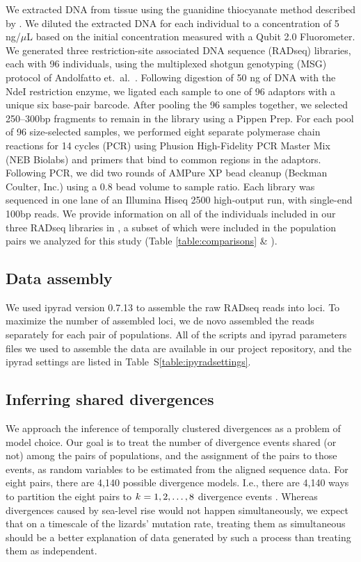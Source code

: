 We extracted DNA from tissue using the guanidine thiocyanate method described
by \citet{Esselstyn2008}.
We diluted the extracted DNA for each individual to a concentration of 5
ng/$\mu$L based on the initial concentration measured with a Qubit 2.0
Fluorometer.
We generated three restriction-site associated DNA sequence (RADseq) libraries,
each with 96 individuals, using the multiplexed shotgun genotyping (MSG)
protocol of Andolfatto et.\ al.\ \citep{Andolfatto2011}.
Following digestion of 50 ng of DNA with the NdeI restriction enzyme, we
ligated each sample to one of 96 adaptors with a unique six base-pair barcode.
After pooling the 96 samples together, we selected 250--300bp fragments to
remain in the library using a Pippen Prep.
For each pool of 96 size-selected samples, we performed eight separate
polymerase chain reactions for 14 cycles (PCR) using Phusion High-Fidelity PCR
Master Mix (NEB Biolabs) and primers that bind to common regions in the
adaptors.
Following PCR, we did two rounds of AMPure XP bead cleanup (Beckman Coulter,
Inc.) using a 0.8 bead volume to sample ratio.
Each library was sequenced in one lane of an Illumina Hiseq 2500 high-output
run, with single-end 100bp reads.
We provide information on all of the individuals included in our three RADseq
libraries in , a subset of which were included in the
population pairs we analyzed for this study (Table \ref{table:comparisons} \&
).

\subsection{Data assembly}
We used ipyrad version 0.7.13 \citep{ipyrad0713} to assemble the raw RADseq
reads into loci.
To maximize the number of assembled loci, we de novo assembled the reads
separately for each pair of populations.
All of the scripts and ipyrad parameters files we used to assemble the data are available
in our project repository, and the ipyrad settings are listed in
Table~S\ref{table:ipyradsettings}.

\subsection{Inferring shared divergences}
We approach the inference of temporally clustered divergences as a problem of
model choice.
Our goal is to treat the number of divergence events shared (or not) among the
pairs of populations, and the assignment of the pairs to those events, as
random variables to be estimated from the aligned sequence data.
For eight pairs, there are 4,140 possible divergence models.
I.e., there are 4,140 ways to partition the eight pairs to $k_{} = 1, 2,
\ldots, 8$ divergence events \citep{Bell1934,Oaks2014dpp,Oaks2018ecoevolity}.
Whereas divergences caused by sea-level rise would not happen simultaneously,
we expect that on a timescale of the lizards' mutation rate, treating them as
simultaneous should be a better explanation of data generated by such a
process than treating them as independent.

